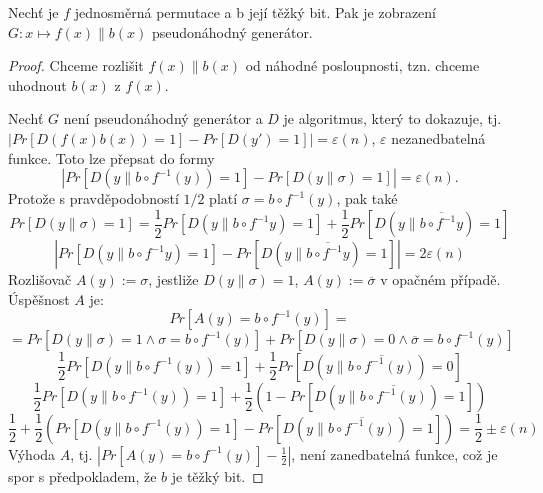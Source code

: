 \begin{thm}
	Nechť je $f$ jednosměrná permutace a b její těžký bit. Pak je zobrazení $G:x\mapsto f(x)\parallel b(x)$ pseudonáhodný generátor.
	\begin{proof}
		Chceme rozlišit $f(x)\parallel b(x)$ od náhodné posloupnosti, tzn. chceme uhodnout $b(x)$ z $f(x)$.

		Nechť $G$ není pseudonáhodný generátor a $D$ je algoritmus, který to dokazuje, tj. $|Pr[D(f(x)b(x))=1]-Pr[D(y')=1]|=\varepsilon(n)$, $\varepsilon$ nezanedbatelná funkce. Toto lze přepsat do formy
		\[
			|Pr[D(y\parallel b\circ f^{-1}(y))=1]-Pr[D(y\parallel \sigma)=1]|=\varepsilon(n).
		\]
		Protože s pravděpodobností $1/2$ platí $\sigma=b\circ f^{-1}(y)$, pak také
		\[
			Pr[D(y\parallel\sigma)=1]=\frac{1}{2}Pr[D(y\parallel b\circ f^{-1}y)=1]+\frac{1}{2}Pr[D(y\parallel \overline{b\circ f^{-1}y})=1]
		\]
		\[
			|Pr[D(y\parallel b\circ f^{-1}y)=1]-Pr[D(y\parallel \overline{b\circ f^{-1}y})=1]|=2\varepsilon(n)
		\]
		Rozlišovač $A(y):=\sigma$, jestliže $D(y\parallel\sigma)=1$, $A(y):=\overline{\sigma}$ v opačném případě. Úspěšnost $A$ je:
		\[
			Pr[A(y)=b\circ f^{-1}(y)]=
		\]
		\[
			=Pr[D(y\parallel\sigma)=1 \land \sigma=b\circ f^{-1}(y)]+Pr[D(y\parallel\sigma)=0 \land \overline{\sigma}=b\circ f^{-1}(y)]
		\]
		\[
			\frac{1}{2}Pr[D(y\parallel b\circ f^{-1}(y))=1]+\frac{1}{2}Pr[D(y\parallel \overline{b\circ f^{-1}(y)})=0]
		\]
		\[
			\frac{1}{2}Pr[D(y\parallel b\circ f^{-1}(y))=1]+\frac{1}{2}(1-Pr[D(y\parallel \overline{b\circ f^{-1}(y)})=1])
		\]
		\[
			\frac{1}{2}+\frac{1}{2}(Pr[D(y\parallel b\circ f^{-1}(y))=1]-Pr[D(y\parallel \overline{b\circ f^{-1}(y)})=1])=\frac{1}{2}\pm\varepsilon(n)
		\]
		Výhoda $A$, tj. $|Pr[A(y)=b\circ f^{-1}(y)]-\frac{1}{2}|$, není zanedbatelná funkce, což je spor s předpokladem, že $b$ je těžký bit.
	\end{proof}
\end{thm}

